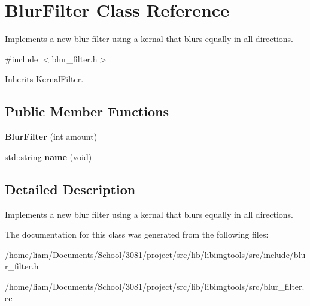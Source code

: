 \hypertarget{classBlurFilter}{}\section{Blur\+Filter Class Reference}
\label{classBlurFilter}


Implements a new blur filter using a kernal that blurs equally in all directions.  




{\ttfamily \#include $<$blur\+\_\+filter.\+h$>$}



Inherits \hyperlink{classKernalFilter}{Kernal\+Filter}.

\subsection*{Public Member Functions}
\begin{DoxyCompactItemize}
\item 
{\bfseries Blur\+Filter} (int amount)\hypertarget{classBlurFilter_a73d0549064b1269e3fe098bdc07d9f91}{}\label{classBlurFilter_a73d0549064b1269e3fe098bdc07d9f91}

\item 
std\+::string {\bfseries name} (void)\hypertarget{classBlurFilter_a417b543f31bc847bf65685ea25ffb7b4}{}\label{classBlurFilter_a417b543f31bc847bf65685ea25ffb7b4}

\end{DoxyCompactItemize}


\subsection{Detailed Description}
Implements a new blur filter using a kernal that blurs equally in all directions. 

The documentation for this class was generated from the following files\+:\begin{DoxyCompactItemize}
\item 
/home/liam/\+Documents/\+School/3081/project/src/lib/libimgtools/src/include/blur\+\_\+filter.\+h\item 
/home/liam/\+Documents/\+School/3081/project/src/lib/libimgtools/src/blur\+\_\+filter.\+cc\end{DoxyCompactItemize}
